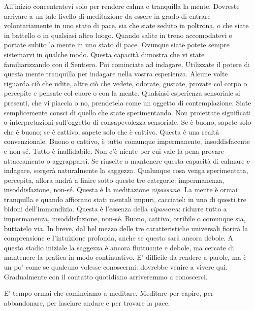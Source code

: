 All'inizio concentratevi solo per rendere calma e tranquilla la mente.
Dovreste arrivare a un tale livello di meditazione da essere in grado di
entrare volontariamente in uno stato di pace, sia che siate seduto in
poltrona, o che siate in battello o in qualsiasi altro luogo. Quando
salite in treno accomodatevi e portate subito la mente in uno stato di
pace. Ovunque siate potete sempre sistemarvi in qualche modo. Questa
capacità dimostra che vi state familiarizzando con il Sentiero. Poi
cominciate ad indagare. Utilizzate il potere di questa mente tranquilla
per indagare nella vostra esperienza. Alcune volte riguarda ciò che
udite, altre ciò che vedete, odorate, gustate, provate col corpo o
percepite e pensate col cuore o con la mente. Qualsiasi esperienza
sensoriale si presenti, che vi piaccia o no, prendetela come un oggetto
di contemplazione. Siate semplicemente consci di quello che state
sperimentando. Non proiettate significati o interpretazioni sull'oggetto
di consapevolezza sensoriale. Se è buono, sapete solo che è buono; se è
cattivo, sapete solo che è cattivo. Questa è una realtà convenzionale.
Buono o cattivo, è tutto comunque impermanente, insoddisfacente e
non-sé. Tutto è inaffidabile. Non c'è niente per cui vale la pena
provare attaccamento o aggrapparsi. Se riuscite a mantenere questa
capacità di calmare e indagare, sorgerà naturalmente la saggezza.
Qualunque cosa venga sperimentata, percepita, allora andrà a finire
sotto queste tre categorie: impermanenza, insoddisfazione, non-sé.
Questa è la meditazione \emph{vipassana}. La mente è ormai tranquilla e quando
affiorano stati mentali impuri, cacciateli in uno di questi tre bidoni
dell'immondizia. Questa è l'essenza della \emph{vipassana}: ridurre tutto a
impermanenza, insoddisfazione, non-sé. Buono, cattivo, orribile o
comunque sia, buttatelo via. In breve, dal bel mezzo delle tre
caratteristiche universali fiorirà la comprensione e l'intuizione
profonda, anche se questa sarà ancora debole. A questo stadio iniziale
la saggezza è ancora fluttuante e debole, ma cercate di mantenere la
pratica in modo continuativo. E' difficile da rendere a parole, ma è un
po' come se qualcuno volesse conoscermi: dovrebbe venire a vivere qui.
Gradualmente con il contatto quotidiano arriveremmo a
conoscerci.


E' tempo ormai che cominciamo a meditare. Meditare per capire, per
abbandonare, per lasciare andare e per trovare la pace.

